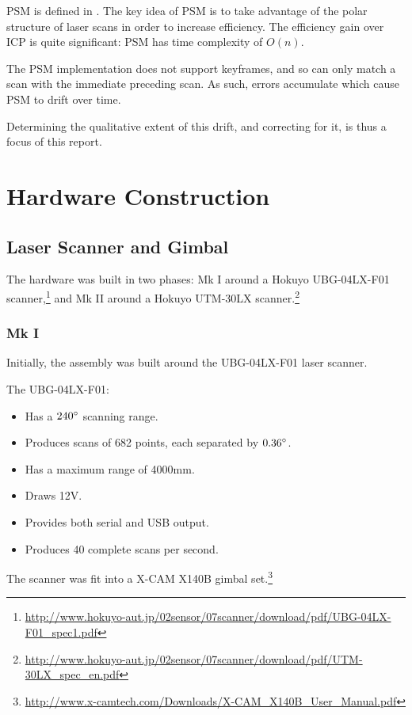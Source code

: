 \documentclass[12pt,oneside,a4paper]{book}
\begin{document}
PSM is defined in \cite{polarscanmatching}. The key idea of PSM is to
take advantage of the polar structure of laser scans in order to
increase efficiency.  The efficiency gain over ICP is quite
significant: PSM has time complexity of $O(n)$.

The PSM implementation does not support keyframes, and so can only
match a scan with the immediate preceding scan. As such, errors
accumulate which cause PSM to drift over time.

Determining the qualitative extent of this drift, and correcting for
it, is thus a focus of this report.
\section{Hardware Construction}
\label{sec:hardware}

\subsection{Laser Scanner and Gimbal}
\label{sec:laser-scanner-gimbal}

The hardware was built in two phases: Mk I around a Hokuyo
UBG-04LX-F01
scanner,\footnote{\url{http://www.hokuyo-aut.jp/02sensor/07scanner/download/pdf/UBG-04LX-F01_spec1.pdf}}
and Mk II around a Hokuyo UTM-30LX scanner.\footnote{\url{http://www.hokuyo-aut.jp/02sensor/07scanner/download/pdf/UTM-30LX_spec_en.pdf}}


\subsubsection{Mk I}
\label{sec:mk-i}

Initially, the assembly was built around the UBG-04LX-F01 laser
scanner.

The UBG-04LX-F01:
\begin{itemize}
\item Has a $240\degree$ scanning range.
\item Produces scans of 682 points, each separated by $0.36\degree$.
\item Has a maximum range of 4000mm.
\item Draws 12V.
\item Provides both serial and USB output.
\item Produces 40 complete scans per second.
\end{itemize}

The scanner was fit into a X-CAM X140B gimbal set.\footnote{\url{http://www.x-camtech.com/Downloads/X-CAM_X140B_User_Manual.pdf}}
\end{document}
